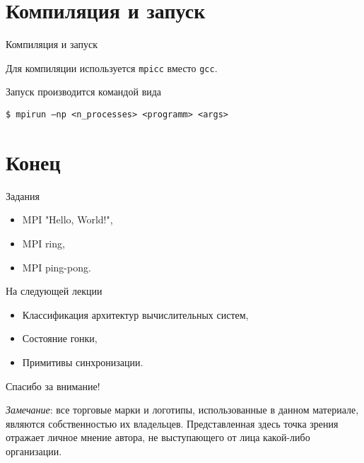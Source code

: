 \section{Компиляция и запуск}

\begin{frame}[fragile]{Компиляция и запуск}

Для компиляции используется \texttt{mpicc} вместо \texttt{gcc}.

\vfill

Запуск производится командой вида

\begin{lstlisting}
$ mpirun –np <n_processes> <programm> <args>
\end{lstlisting}

\end{frame}

\section{Конец}

\begin{frame}{Задания}

\begin{itemize}
    \item MPI "Hello, World!",
    \item MPI ring,
    \item MPI ping-pong.
\end{itemize}

\end{frame}

\begin{frame}{На следующей лекции}

\begin{itemize}
    \item Классификация архитектур вычислительных систем,
    \item Состояние гонки,
    \item Примитивы синхронизации.
\end{itemize}

\end{frame}

\begin{frame}

{\huge{Спасибо за внимание!}\par}

\vfill

\tiny{\textit{Замечание}: все торговые марки и логотипы, использованные в данном материале, являются собственностью их владельцев. Представленная здесь точка зрения отражает личное мнение автора, не выступающего от лица какой-либо организации.}

\end{frame}


